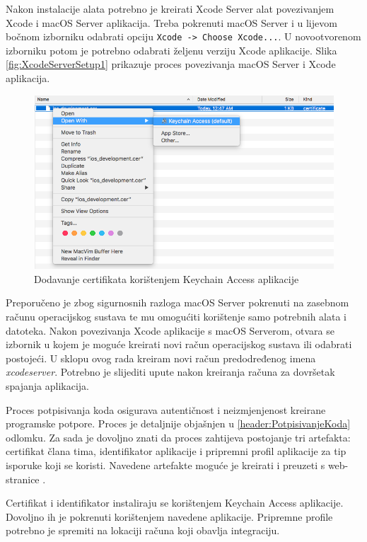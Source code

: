 \documentclass[times, utf8, diplomski, numeric]{fer}
\begin{document}
Nakon instalacije alata potrebno je kreirati Xcode Server alat povezivanjem Xcode i macOS Server aplikacija. Treba pokrenuti macOS Server i u lijevom bočnom izborniku odabrati opciju \verb|Xcode -> Choose Xcode...|. U novootvorenom izborniku potom je potrebno odabrati željenu verziju Xcode aplikacije. Slika \ref{fig:XcodeServerSetup1} prikazuje proces povezivanja macOS Server i Xcode aplikacija.

\begin{figure}[b!]
\centering
\includegraphics[scale=0.4]{DodavanjeCertifikata}
\caption{Dodavanje certifikata korištenjem Keychain Access aplikacije}
\label{fig:DodavanjeCertifikata}
\end{figure}

Preporučeno je zbog sigurnosnih razloga macOS Server pokrenuti na zasebnom računu operacijskog sustava te mu omogućiti korištenje samo potrebnih alata i datoteka. Nakon povezivanja Xcode aplikacije s macOS Serverom, otvara se izbornik u kojem je moguće kreirati novi račun operacijskog sustava ili odabrati postojeći. U sklopu ovog rada kreiram novi račun predodređenog imena \textit{xcodeserver}. Potrebno je slijediti upute nakon kreiranja računa za dovršetak spajanja aplikacija.

Proces potpisivanja koda osigurava autentičnost i neizmjenjenost kreirane programske potpore. Proces je detaljnije objašnjen u \ref{header:PotpisivanjeKoda} odlomku. Za sada je dovoljno znati da proces zahtijeva postojanje tri artefakta: certifikat člana tima, identifikator aplikacije i pripremni profil aplikacije za tip isporuke koji se koristi. Navedene artefakte moguće je kreirati i preuzeti s web-stranice .

Certifikat i identifikator instaliraju se korištenjem Keychain Access aplikacije. Dovoljno ih je pokrenuti korištenjem navedene aplikacije. Pripremne profile potrebno je spremiti na lokaciji  računa koji obavlja integraciju.
\end{document}
